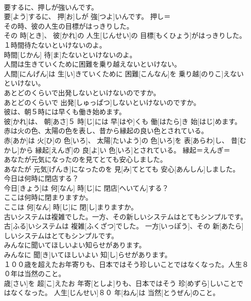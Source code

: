\documentclass[8pt]{extreport}
\begin{document}
\begin{CJK}{UTF8}{min}
\\	要するに、押しが強いんです。	
\\	要[よう]するに、 押[お]しが 強[つよ]いんです。	押し＝ 
\\	その時、彼の人生の目標がはっきりした。	
\\	その 時[とき]、 彼[かれ]の 人生[じんせい]の 目標[もくひょう]がはっきりした。	
\\	１時間待たないといけないのよ。	
\\	時間[じかん] 待[ま]たないといけないのよ。	
\\	人間は生きていくために困難を乗り越えないといけない。	
\\	人間[にんげん]は 生[い]きていくために 困難[こんなん]を 乗り越[のりこ]えないといけない。	
\\	あとどのくらいで出発しないといけないのですか。	
\\	あとどのくらいで 出発[しゅっぱつ]しないといけないのですか。	
\\	彼は、朝５時には早くも働き始めます。	
\\	彼[かれ]は、 朝[あさ]５ 時[じ]には 早[はや]くも 働[はたら]き 始[はじ]めます。	
\\	赤は火の色、太陽の色を表し、昔から縁起の良い色とされている。	
\\	赤[あか]は 火[ひ]の 色[いろ]、 太陽[たいよう]の 色[いろ]を 表[あらわ]し、 昔[むかし]から 縁起[えんぎ]の 良[よ]い 色[いろ]とされている。	縁起＝えんぎ＝ 
\\	あなたが元気になったのを見てとても安心しました。	
\\	あなたが 元気[げんき]になったのを 見[み]てとても 安心[あんしん]しました。	
\\	今日は何時に閉店する？	
\\	今日[きょう]は 何[なん] 時[じ]に 閉店[へいてん]する？	
\\	ここは何時に閉まりますか。	
\\	ここは 何[なん] 時[じ]に 閉[し]まりますか。	
\\	古いシステムは複雑でした。一方、その新しいシステムはとてもシンプルです。	
\\	古[ふる]いシステムは 複雑[ふくざつ]でした。 一方[いっぽう]、その 新[あたら]しいシステムはとてもシンプルです。	
\\	みんなに聞いてほしいよい知らせがあります。	
\\	みんなに 聞[き]いてほしいよい 知[し]らせがあります。	
\\	１００歳を超えたお年寄りも、日本ではそう珍しいことではなくなった。人生８０年は当然のこと。	
\\	歳[さい]を 超[こ]えたお 年寄[としよ]りも、日本ではそう 珍[めずら]しいことではなくなった。 人生[じんせい]８０ 年[ねん]は 当然[とうぜん]のこと。	

\end{CJK}
\end{document}

